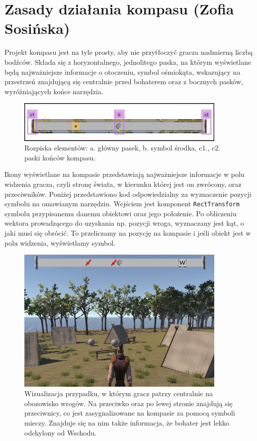 
\section{Zasady działania kompasu (Zofia Sosińska)}\label{chap:naw}

Projekt kompasu jest na tyle prosty, aby nie przytłoczyć gracza nadmierną liczbą bodźców. Składa się z horyzontalnego, jednolitego paska,
 na którym wyświetlane będą najważniejsze informacje o otoczeniu, symbol ośmiokąta, wskazujący na przestrzeń znajdującą się centralnie przed bohaterem
  oraz z bocznych pasków, wyróżniających końce narzędzia.

\begin{figure}[htbp]
    \centering
    \includegraphics[width=0.9\textwidth]{images/ui/opis_ekementow_kompasu.png}
    \caption{Rozpiska elementów: a. główny pasek, b. symbol środka, c1., c2. paski końców kompasu.}\label{fig:compass_design}
\end{figure}

Ikony wyświetlane na kompasie przedstawiają najważniejsze informacje w polu widzenia gracza, czyli stronę świata, w kierunku której jest on zwrócony, oraz przeciwników.
Poniżej przedstawiono kod odpowiedzialny za wyznaczenie pozycji symbolu na omawianym narzędziu. Wejściem jest komponent \texttt{RectTransform} symbolu przypisanemu
 danemu obiektowi oraz jego położenie. Po obliczeniu wektora prowadzącego do uzyskania np. pozycji wroga, wyznaczany jest kąt, o jaki musi się obrócić.
  To przeliczamy na pozycję na kompasie i jeśli obiekt jest w polu widzenia, wyświetlamy symbol.

\begin{figure}[htbp]
    \centering
    \includegraphics[width=0.9\textwidth]{images/ui/compass.png}
    \caption{Wizualizacja przypadku, w którym gracz patrzy centralnie na obozowisko wrogów. Na przeciwko oraz po lewej stronie znajdują się przeciwnicy, co jest zasygnalizowane na kompasie za pomocą symboli mieczy. Znajduje się na nim także informacja, że bohater jest lekko odchylony od Wschodu.
    }\label{fig:compass}
\end{figure}

